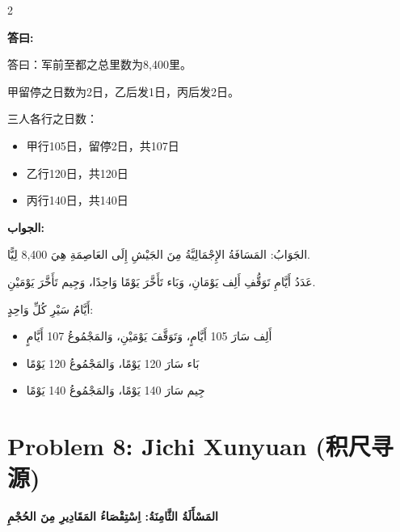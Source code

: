 \documentclass[11pt,a4paper]{article}
\newcommand{\ar}[1]{\arabicfont\beginR #1\endR}
\newcommand{\zhtext}[1]{{\chinese #1}}
\newenvironment{bilingual}{%
  \begin{paracol}{2}
}{%
  \end{paracol}
}
\newcommand{\cnlabel}[1]{\textcolor{algocolor}{\textbf{#1}}}
\newcommand{\arlabel}[1]{\ar{\textcolor{algocolor}{\textbf{#1}}}}
\begin{document}
\begin{bilingual}

\begin{leftcolumn*}
\cnlabel{答曰:}

答曰：军前至都之总里数为8,400里。

甲留停之日数为2日，乙后发1日，丙后发2日。

三人各行之日数：
\begin{itemize}
  \item 甲行105日，留停2日，共107日
  \item 乙行120日，共120日
  \item 丙行140日，共140日
\end{itemize}
\end{leftcolumn*}

\begin{rightcolumn*}
\arlabel{الجواب:}

\ar{الجَوَابُ: المَسَافَةُ الإِجْمَالِيَّةُ مِنَ الجَيْشِ إِلَى العَاصِمَةِ هِيَ 8,400 لِيًّا.}

\ar{عَدَدُ أَيَّامِ تَوَقُّفِ أَلِف يَوْمَانِ، وَبَاء تَأَخَّرَ يَوْمًا وَاحِدًا، وَجِيم تَأَخَّرَ يَوْمَيْنِ.}

\ar{أَيَّامُ سَيْرِ كُلِّ وَاحِدٍ:}
\begin{itemize}
  \item \ar{أَلِف سَارَ 105 أَيَّامٍ، وَتَوَقَّفَ يَوْمَيْنِ، وَالمَجْمُوعُ 107 أَيَّامٍ}
  \item \ar{بَاء سَارَ 120 يَوْمًا، وَالمَجْمُوعُ 120 يَوْمًا}
  \item \ar{جِيم سَارَ 140 يَوْمًا، وَالمَجْمُوعُ 140 يَوْمًا}
\end{itemize}
\end{rightcolumn*}

\end{bilingual}

\newpage

\section{Problem 8: Jichi Xunyuan (\zhtext{积尺寻源})}
\ar{\textbf{المَسْأَلَةُ الثَّامِنَةُ: اِسْتِقْصَاءُ المَقَادِيرِ مِنَ الحُجْمِ}}
\end{document}
